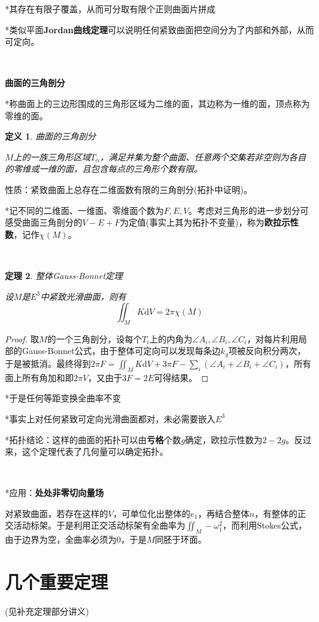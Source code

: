 \documentclass[a4paper,UTF8,fontset=windows]{ctexart}
\newtheorem{thm}{定理}[section]
\newtheorem{dfn}[thm]{定义}
\begin{document}
*其存在有限子覆盖，从而可分取有限个正则曲面片拼成

*类似平面\textbf{Jordan曲线定理}可以说明任何紧致曲面把空间分为了内部和外部，从而可定向。

\

\textbf{曲面的三角剖分}

*称曲面上的三边形围成的三角形区域为二维的面，其边称为一维的面，顶点称为零维的面。

\begin{dfn} 曲面的三角剖分

$M$上的一族三角形区域$T_\alpha$，满足并集为整个曲面、任意两个交集若非空则为各自的零维或一维的面，且包含每点的三角形个数有限。
\end{dfn}

性质：紧致曲面上总存在二维面数有限的三角剖分(拓扑中证明)。

*记不同的二维面、一维面、零维面个数为$F,E,V$。考虑对三角形的进一步划分可感受曲面三角剖分的$V-E+F$为定值(事实上其为拓扑不变量)，称为\textbf{欧拉示性数}，记作$\chi(M)$。

\

\begin{thm} 整体Gauss-Bonnet定理

设$M$是$E^3$中紧致光滑曲面，则有
$$\iint_MK\mathrm{d}V=2\pi\chi(M)$$
\end{thm}

\begin{proof}
取$M$的一个三角剖分，设每个$T_i$上的内角为$\angle A_i,\angle B_i,\angle C_i$，对每片利用局部的Gauss-Bonnet公式，由于整体可定向可以发现每条边$k_g$项被反向积分两次，于是被抵消。最终得到$2\pi F=\iint_MK\mathrm{d}V+3\pi F-\sum_i(\angle A_i+\angle B_i+\angle C_i)$，所有面上所有角加和即$2\pi V$，又由于$3F=2E$可得结果。
\end{proof}

*于是任何等距变换全曲率不变

*事实上对任何紧致可定向光滑曲面都对，未必需要嵌入$E^3$

*拓扑结论：这样的曲面的拓扑可以由\textbf{亏格}个数$g$确定，欧拉示性数为$2-2g$。反过来，这个定理代表了几何量可以确定拓扑。

\

*应用：\textbf{处处非零切向量场}

对紧致曲面，若存在这样的$V$，可单位化出整体的$e_1$，再结合整体$n$，有整体的正交活动标架。于是利用正交活动标架有全曲率为$\iint_M-\omega_1^2$，而利用Stokes公式，由于边界为空，全曲率必须为0，于是$M$同胚于环面。

\section{几个重要定理}
(见补充定理部分讲义)
\end{document}
